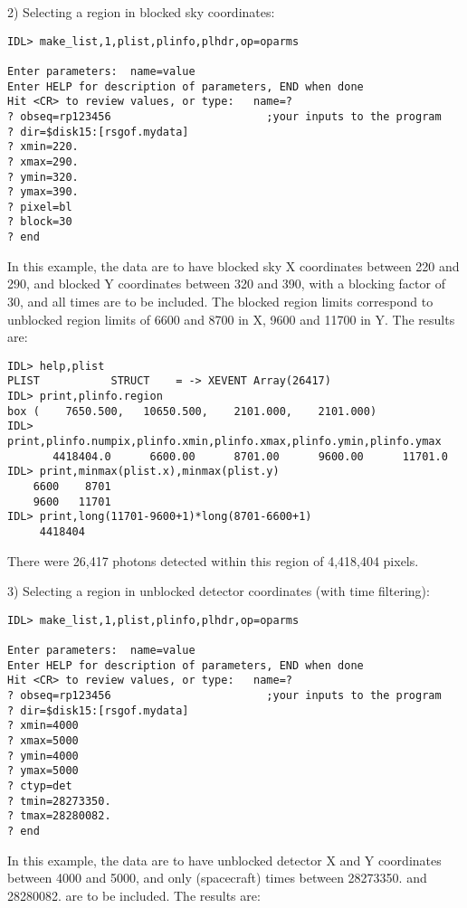 2) Selecting a region in blocked sky coordinates:

\medskip\noindent
\begin{verbatim}
IDL> make_list,1,plist,plinfo,plhdr,op=oparms
 
Enter parameters:  name=value
Enter HELP for description of parameters, END when done
Hit <CR> to review values, or type:   name=?
? obseq=rp123456                        ;your inputs to the program
? dir=$disk15:[rsgof.mydata]
? xmin=220.
? xmax=290.
? ymin=320.
? ymax=390.
? pixel=bl
? block=30
? end
\end{verbatim}
In this example, the data are to have blocked sky X coordinates between 220 and
290, and blocked Y coordinates between 320 and 390, with a blocking factor of
30, and all times are to be included. The blocked region limits correspond to
unblocked region limits of 6600 and 8700 in X, 9600 and 11700 in Y. The results
are:

\medskip\noindent
\begin{verbatim}
IDL> help,plist
PLIST           STRUCT    = -> XEVENT Array(26417)
IDL> print,plinfo.region
box (    7650.500,   10650.500,    2101.000,    2101.000)
IDL> print,plinfo.numpix,plinfo.xmin,plinfo.xmax,plinfo.ymin,plinfo.ymax
       4418404.0      6600.00      8701.00      9600.00      11701.0
IDL> print,minmax(plist.x),minmax(plist.y)
    6600    8701
    9600   11701
IDL> print,long(11701-9600+1)*long(8701-6600+1)
     4418404
\end{verbatim}
There were 26,417 photons detected within this region of 4,418,404 pixels.
 
3) Selecting a region in unblocked detector coordinates (with time filtering):

\medskip\noindent
\begin{verbatim}
IDL> make_list,1,plist,plinfo,plhdr,op=oparms
 
Enter parameters:  name=value
Enter HELP for description of parameters, END when done
Hit <CR> to review values, or type:   name=?
? obseq=rp123456                        ;your inputs to the program
? dir=$disk15:[rsgof.mydata]
? xmin=4000
? xmax=5000
? ymin=4000
? ymax=5000
? ctyp=det
? tmin=28273350.
? tmax=28280082.
? end
\end{verbatim}
In this example, the data are to have unblocked detector X and Y coordinates
between 4000 and 5000, and only (spacecraft) times between 28273350. and
28280082. are to be included. The results are:

